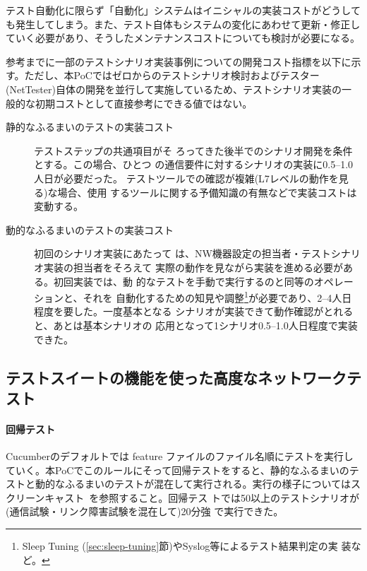 テスト自動化に限らず「自動化」システムはイニシャルの実装コストがどうして
も発生してしまう。また、テスト自体もシステムの変化にあわせて更新・修正し
ていく必要があり、そうしたメンテナンスコストについても検討が必要になる。

参考までに一部のテストシナリオ実装事例についての開発コスト指標を以下に示
す。ただし、本PoCではゼロからのテストシナリオ検討およびテスター
(NetTester)自体の開発を並行して実施しているため、テストシナリオ実装の一
般的な初期コストとして直接参考にできる値ではない。
\begin{description}
 \item[静的なふるまいのテストの実装コスト] テストステップの共通項目がそ
            ろってきた後半でのシナリオ開発を条件とする。この場合、ひとつ
            の通信要件に対するシナリオの実装に0.5--1.0人日が必要だった。
            テストツールでの確認が複雑(L7レベルの動作を見る)な場合、使用
            するツールに関する予備知識の有無などで実装コストは変動する。
 \item[動的なふるまいのテストの実装コスト] 初回のシナリオ実装にあたって
            は、NW機器設定の担当者・テストシナリオ実装の担当者をそろえて
            実際の動作を見ながら実装を進める必要がある。初回実装では、動
            的なテストを手動で実行するのと同等のオペレーションと、それを
            自動化するための知見や調整\footnote{Sleep Tuning
            (\ref{sec:sleep-tuning}節)やSyslog等によるテスト結果判定の実
            装など。}が必要であり、2--4人日程度を要した。一度基本となる
            シナリオが実装できて動作確認がとれると、あとは基本シナリオの
            応用となって1シナリオ0.5--1.0人日程度で実装できた。
\end{description}

  \subsection{テストスイートの機能を使った高度なネットワークテスト}

    \paragraph{回帰テスト}
Cucumberのデフォルトでは feature ファイルのファイル名順にテストを実行し
ていく。本PoCでこのルールにそって回帰テストをすると、静的なふるまいのテ
ストと動的なふるまいのテストが混在して実行される。実行の様子についてはス
クリーンキャスト~\cite{nettester-asciinema-full}を参照すること。回帰テス
トでは50以上のテストシナリオが(通信試験・リンク障害試験を混在して)20分強
で実行できた。

